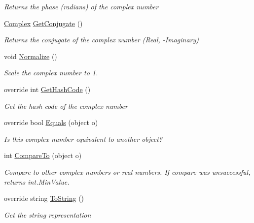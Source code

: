 \begin{DoxyCompactItemize}
\begin{DoxyCompactList}\small\item\em Returns the phase (radians) of the complex number \end{DoxyCompactList}\item 
\mbox{\hyperlink{struct_c_s_i_1_1_library_1_1_data_types_1_1_complex}{Complex}} \mbox{\hyperlink{struct_c_s_i_1_1_library_1_1_data_types_1_1_complex_a4a47bbe93af39f283e01a2f4f2b2a326}{Get\+Conjugate}} ()
\begin{DoxyCompactList}\small\item\em Returns the conjugate of the complex number (Real, -\/Imaginary) \end{DoxyCompactList}\item 
void \mbox{\hyperlink{struct_c_s_i_1_1_library_1_1_data_types_1_1_complex_a0ab8db50d75fb2fabc49521526740213}{Normalize}} ()
\begin{DoxyCompactList}\small\item\em Scale the complex number to 1. \end{DoxyCompactList}\item 
override int \mbox{\hyperlink{struct_c_s_i_1_1_library_1_1_data_types_1_1_complex_a47a48abff04a9b80fedb13868086c298}{Get\+Hash\+Code}} ()
\begin{DoxyCompactList}\small\item\em Get the hash code of the complex number \end{DoxyCompactList}\item 
override bool \mbox{\hyperlink{struct_c_s_i_1_1_library_1_1_data_types_1_1_complex_acdaf8fc1fd25ec76ad19b2f20204cfdb}{Equals}} (object o)
\begin{DoxyCompactList}\small\item\em Is this complex number equivalent to another object? \end{DoxyCompactList}\item 
int \mbox{\hyperlink{struct_c_s_i_1_1_library_1_1_data_types_1_1_complex_a27d16f899cc6ccb96097992df78e6097}{Compare\+To}} (object o)
\begin{DoxyCompactList}\small\item\em Compare to other complex numbers or real numbers. If compare was unsuccessful, returns int.\+Min\+Value. \end{DoxyCompactList}\item 
override string \mbox{\hyperlink{struct_c_s_i_1_1_library_1_1_data_types_1_1_complex_a0169362f3e44a3354c4d8feb00c3d9bc}{To\+String}} ()
\begin{DoxyCompactList}\small\item\em Get the string representation \end{DoxyCompactList}\end{DoxyCompactItemize}
